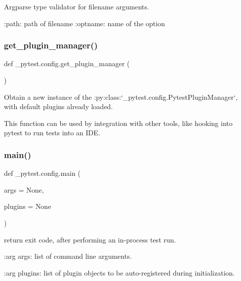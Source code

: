 \begin{DoxyVerb}Argparse type validator for filename arguments.

:path: path of filename
:optname: name of the option
\end{DoxyVerb}
 \mbox{\label{namespace__pytest_1_1config_ae94af57e2987e05f9de5a48fb4e5d6dd}} 
\subsubsection{\texorpdfstring{get\+\_\+plugin\+\_\+manager()}{get\_plugin\_manager()}}
{\footnotesize\ttfamily def \+\_\+pytest.\+config.\+get\+\_\+plugin\+\_\+manager (\begin{DoxyParamCaption}{ }\end{DoxyParamCaption})}

\begin{DoxyVerb}Obtain a new instance of the
:py:class:`_pytest.config.PytestPluginManager`, with default plugins
already loaded.

This function can be used by integration with other tools, like hooking
into pytest to run tests into an IDE.
\end{DoxyVerb}
 \mbox{\label{namespace__pytest_1_1config_aa283449cbd8f4350fafbace4f4c0d97a}} 
\subsubsection{\texorpdfstring{main()}{main()}}
{\footnotesize\ttfamily def \+\_\+pytest.\+config.\+main (\begin{DoxyParamCaption}\item[{}]{args = {\ttfamily None},  }\item[{}]{plugins = {\ttfamily None} }\end{DoxyParamCaption})}

\begin{DoxyVerb}return exit code, after performing an in-process test run.

:arg args: list of command line arguments.

:arg plugins: list of plugin objects to be auto-registered during
              initialization.
\end{DoxyVerb}
 

